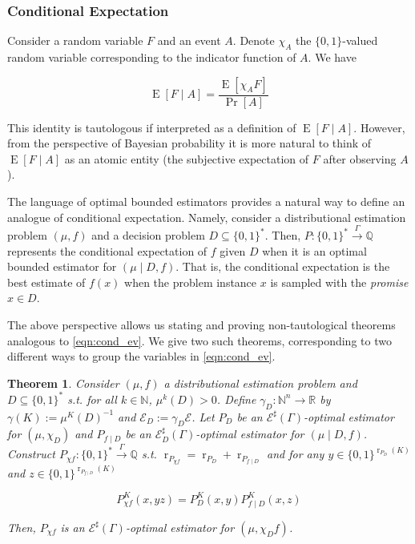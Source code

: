 \documentclass{article}
\numberwithin{equation}{section}
\theoremstyle{definition}
\theoremstyle{plain}
\newtheorem{theorem}{Theorem}[section]
\newcommand{\Bool}{\{0,1\}}
\newcommand{\Words}{{\Bool^*}}
\DeclareMathOperator{\Prb}{Pr}
\DeclareMathOperator{\E}{E}
\DeclareMathOperator{\R}{r}
\newcommand{\Nats}{\mathbb{N}}
\newcommand{\Rats}{\mathbb{Q}}
\newcommand{\Reals}{\mathbb{R}}
\newcommand{\NatFun}{\Nats^n \rightarrow}
\newcommand{\Fall}{\mathcal{E}}
\newcommand{\ESG}{\Fall^\sharp(\Gamma)}
\newcommand{\BoolR}[1]{\Bool^{\R_{#1}(K)}}
\newcommand{\Scheme}{\xrightarrow{\Gamma}}
\begin{document}
\subsubsection{Conditional Expectation}

Consider a random variable $F$ and an event $A$. Denote $\chi_A$ the $\Bool$-valued random variable corresponding to the indicator function of $A$. We have

\begin{equation}
\label{eqn:cond_ev}
\E[F \mid A] = \frac{\E[\chi_A F]}{\Prb[A]}
\end{equation}

This identity is tautologous if interpreted as a definition of $\E[F \mid A]$. However, from the perspective of Bayesian probability it is more natural to think of $\E[F \mid A]$ as an atomic entity (the subjective expectation of $F$ after observing $A$). 

The language of optimal bounded estimators provides a natural way to define an analogue of conditional expectation. Namely, consider a distributional estimation problem $(\mu, f)$ and a decision problem ${D \subseteq \Words}$. Then, $P: \Words \Scheme \Rats$ represents the conditional expectation of $f$ given $D$ when it is an optimal bounded estimator for $(\mu \mid D, f)$. That is, the conditional expectation is the best estimate of $f(x)$ when the problem instance $x$ is sampled with the \emph{promise} $x \in D$.

The above perspective allows us stating and proving non-tautological theorems analogous to \ref{eqn:cond_ev}. We give two such theorems, corresponding to two different ways to group the variables in \ref{eqn:cond_ev}.

\begin{samepage}
\begin{theorem}

Consider $(\mu, f)$ a distributional estimation problem and ${D \subseteq \Words}$ s.t. for all $k \in \Nats$, $\mu^k(D) > 0$. Define $\gamma_D: \NatFun \Reals$ by $\gamma(K):=\mu^{K}(D)^{-1}$ and $\Fall_D:=\gamma_D \Fall$. Let $P_D$ be an $\ESG$-optimal estimator for $(\mu, \chi_D)$ and $P_{f \mid D}$ be an $\Fall_D^\sharp(\Gamma)$-optimal estimator for ${(\mu \mid D, f)}$. Construct ${P_{\chi f}: \Words \Scheme \Rats}$ s.t. $\R_{P_{\chi f}}=\R_{P_D} + \R_{P_{f \mid D}}$ and for any $y \in \BoolR{P_D}$ and ${z \in \BoolR{P_{f \mid D}}}$

\begin{equation}
P_{\chi f}^K(x,yz)=P_D^K(x,y) P_{f \mid D}^K(x,z)
\end{equation}

Then, $P_{\chi f}$ is an $\ESG$-optimal estimator for $(\mu, \chi_Df)$.

\end{theorem}
\end{samepage}
\end{document}
